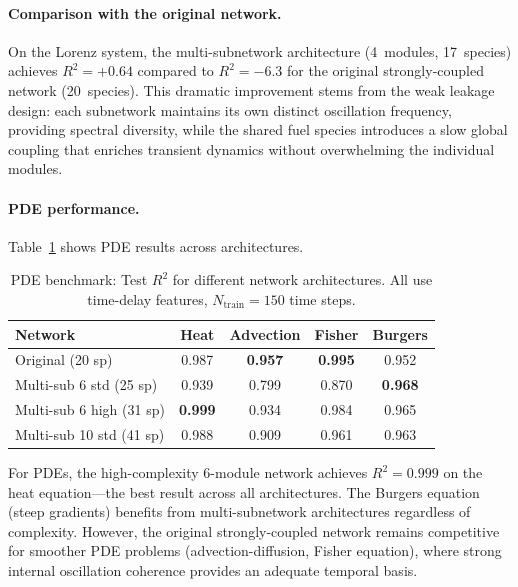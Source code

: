 \documentclass[11pt,twocolumn]{article}
\begin{document}
\paragraph{Comparison with the original network.}
On the Lorenz system, the multi-subnetwork architecture (4~modules, 17~species)
achieves $R^2 = +0.64$ compared to $R^2 = -6.3$ for the original
strongly-coupled network (20~species).  This dramatic improvement stems from
the weak leakage design: each subnetwork maintains its own distinct oscillation
frequency, providing spectral diversity, while the shared fuel species
introduces a slow global coupling that enriches transient dynamics without
overwhelming the individual modules.

\paragraph{PDE performance.}
Table~\ref{tab:pde_architecture} shows PDE results across architectures.

\begin{table}[t]
\centering
\caption{PDE benchmark: Test $R^2$ for different network architectures.
  All use time-delay features, $N_{\text{train}}=150$ time steps.}
\label{tab:pde_architecture}
\small
\begin{tabular}{@{}lcccc@{}}
\hline
Network & Heat & Advection & Fisher & Burgers \\
\hline
Original (20 sp)       & 0.987 & \textbf{0.957} & \textbf{0.995} & 0.952 \\
Multi-sub 6 std (25 sp) & 0.939 & 0.799 & 0.870 & \textbf{0.968} \\
Multi-sub 6 high (31 sp) & \textbf{0.999} & 0.934 & 0.984 & 0.965 \\
Multi-sub 10 std (41 sp) & 0.988 & 0.909 & 0.961 & 0.963 \\
\hline
\end{tabular}
\end{table}

For PDEs, the high-complexity 6-module network achieves $R^2 = 0.999$ on the
heat equation---the best result across all architectures.  The Burgers equation
(steep gradients) benefits from multi-subnetwork architectures regardless of
complexity.  However, the original strongly-coupled network remains competitive
for smoother PDE problems (advection-diffusion, Fisher equation), where strong
internal oscillation coherence provides an adequate temporal basis.
\end{document}
